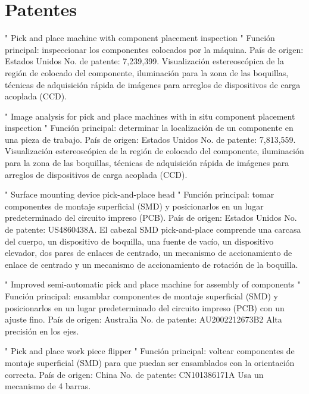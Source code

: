 \section{Patentes}
\label{Patentes}

" Pick and place machine with component placement inspection " \newline
Funci\'on principal: inspeccionar los componentes colocados por la m\'aquina.\newline
Pa\'is de origen: Estados Unidos\newline
No. de patente: 7,239,399.\newline
Visualizaci\'on estereosc\'opica de la regi\'on de colocado del componente, iluminaci\'on para la zona de las boquillas, t\'ecnicas de adquisici\'on r\'apida de im\'agenes para arreglos de dispositivos de carga acoplada (CCD).\par

" Image analysis for pick and place machines with in situ component placement inspection " \newline
Funci\'on principal: determinar la localizaci\'on de un componente en una pieza de trabajo.\newline
Pa\'is de origen: Estados Unidos\newline
No. de patente: 7,813,559.\newline
Visualizaci\'on estereosc\'opica de la regi\'on de colocado del componente, iluminaci\'on para la zona de las boquillas, t\'ecnicas de adquisici\'on r\'apida de im\'agenes para arreglos de dispositivos de carga acoplada (CCD).\par

" Surface mounting device pick-and-place head " \newline
Funci\'on principal: tomar componentes de montaje superficial (SMD) y posicionarlos en un lugar predeterminado del circuito impreso (PCB).\newline
Pa\'is de origen: Estados Unidos\newline
No. de patente: US4860438A.\newline
El cabezal SMD pick-and-place comprende una carcasa del cuerpo, un dispositivo de boquilla, una fuente de vac\'io, un dispositivo elevador, dos pares de enlaces de centrado, un mecanismo de accionamiento de enlace de centrado y un mecanismo de accionamiento de rotaci\'on de la boquilla.\par

" Improved semi-automatic pick and place machine for assembly of components " \newline
Funci\'on principal: ensamblar componentes de montaje superficial (SMD) y posicionarlos en un lugar predeterminado del circuito impreso (PCB) con un ajuste fino.\newline
Pa\'is de origen: Australia\newline
No. de patente: AU2002212673B2 \newline
Alta precisi\'on en los ejes.\par

" Pick and place work piece flipper " \newline
Funci\'on principal: voltear componentes de montaje superficial (SMD) para que puedan ser ensamblados con la orientaci\'on correcta.\newline
Pa\'is de origen: China\newline
No. de patente: CN101386171A\newline
Usa un mecanismo de 4 barras.\par